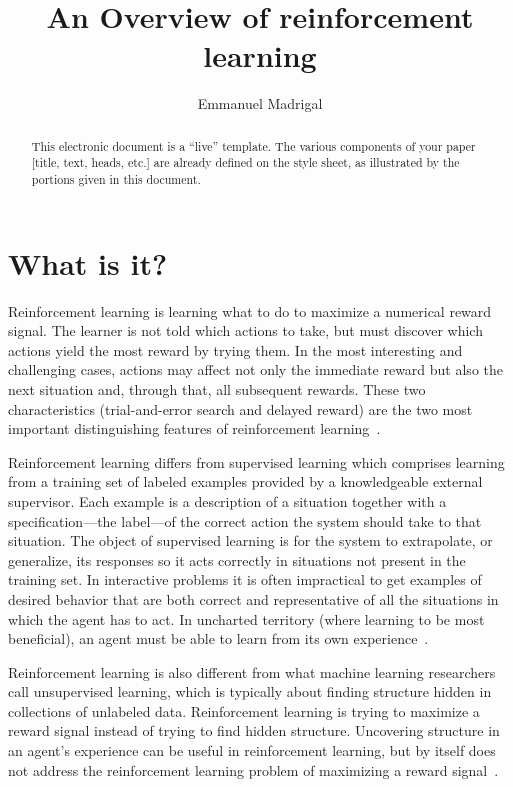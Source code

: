 \documentclass[letterpaper, 10 pt]{IEEEconf}
\title{\LARGE \bf
An Overview of reinforcement learning
}
\author{Emmanuel Madrigal%
}
\begin{document}
\maketitle{}

\begin{abstract}

	This electronic document is a ``live'' template. The various components of your paper [title, text, heads, etc.] are already defined on the style sheet, as illustrated by the portions given in this document.

\end{abstract}

\section{What is it?}

Reinforcement learning is learning what to do to maximize a numerical
reward signal. The learner is not told which actions to take, but must
discover which actions yield the most reward by trying them. In the
most interesting and challenging cases, actions may affect not only
the immediate reward but also the next situation and, through that,
all subsequent rewards. These two characteristics (trial-and-error
search and delayed reward) are the two most important distinguishing
features of reinforcement learning~\cite{sutton2018reinforcement}.

Reinforcement learning differs from supervised learning which
comprises learning from a training set of labeled examples provided by
a knowledgeable external supervisor. Each example is a description of
a situation together with a specification—the label—of the correct
action the system should take to that situation. The object of
supervised learning is for the system to extrapolate, or generalize,
its responses so it acts correctly in situations not present in the
training set. In interactive problems it is often impractical to get
examples of desired behavior that are both correct and representative
of all the situations in which the agent has to act. In uncharted
territory (where learning to be most beneficial), an agent must be
able to learn from its own experience~\cite{sutton2018reinforcement}.

Reinforcement learning is also different from what machine learning
researchers call unsupervised learning, which is typically about
finding structure hidden in collections of unlabeled
data. Reinforcement learning is trying to maximize a reward signal
instead of trying to find hidden structure. Uncovering structure in an
agent’s experience can be useful in reinforcement learning, but by
itself does not address the reinforcement learning problem of
maximizing a reward signal~\cite{sutton2018reinforcement}.
\end{document}
